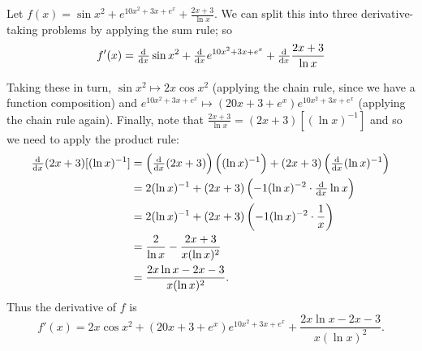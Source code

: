 \begin{ex}
  Let $ f(x) = \sin x^2 + e^{10x^2 + 3x + e^x} + \frac{2x + 3}{\ln x} $. We can split
  this into three derivative-taking problems by applying the sum rule; so
  \begin{displaymath}
    f'(x) = \od{}{x} \sin x^2 + \od{}{x} e^{10x^2 + 3x + e^x} + \od{}{x} \frac{2x + 3}{\ln x}
  \end{displaymath}

  Taking these in turn, $ \sin x^2 \mapsto 2x \cos x^2 $ (applying the chain rule, since we have a
  function composition) and $ e^{10x^2 + 3x + e^x} \mapsto (20x + 3 + e^x) e^{10x^2 + 3x + e^x} $
  (applying the chain rule again). Finally, note that $ \frac{2x + 3}{\ln x} = (2x + 3)[(\ln x)^{-1}] $
  and so we need to apply the product rule:
  \begin{align*}
    \od{}{x} (2x + 3)[(\ln x)^{-1}] &= \left(\od{}{x} (2x + 3)\right)\left( (\ln x)^{-1} \right) + \left(2x + 3\right)\left( \od{}{x} (\ln x)^{-1} \right)\\
                                    &= 2(\ln x)^{-1} + (2x + 3)\left( -1 (\ln x)^{-2} \cdot \od{}{x} \ln x \right)\\
                                    &= 2(\ln x)^{-1} + (2x + 3)\left( -1 (\ln x)^{-2} \cdot \frac{1}{x} \right)\\
                                    &= \frac{2}{\ln x} - \frac{2x + 3}{x (\ln x)^2}\\
                                    &= \frac{2x\ln x - 2x - 3}{x (\ln x)^2}.
  \end{align*}
  Thus the derivative of $ f $ is
  \begin{displaymath}
    f'(x) = 2x \cos x^2 + (20x + 3 + e^x) e^{10x^2 + 3x + e^x} + \frac{2x\ln x - 2x - 3}{x (\ln x)^2}.
  \end{displaymath}
\end{ex}

